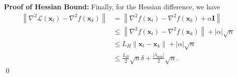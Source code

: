 \documentclass{elsarticle}
\numberwithin{equation}{section}
\begin{document}
\vspace{1em}
\noindent \textbf{Proof of Hessian Bound:}
Finally, for the Hessian difference, we have
\begin{align*}
    \left\| \nabla^2 \mathcal{L}(\mathbf{x}_t) - \nabla^2 f(\mathbf{x}_k) \right\| 
    &= \left\| \nabla^2 f(\mathbf{x}_t) - \nabla^2 f(\mathbf{x}_k) + \alpha \mathbf{I}\right\| \\
    &\leq \left\| \nabla^2 f(\mathbf{x}_t) - \nabla^2 f(\mathbf{x}_k) \right\| +  |\alpha| \sqrt{n} \\
    &\leq L_H \|\mathbf{x}_t - \mathbf{x}_k\| + |\alpha| \sqrt{n} \\
    &\leq \frac{L_H}{2} \sqrt{n} \delta + \frac{|\lambda_{\min}|}{2} \sqrt{n}.
\end{align*}
\qed
\end{document}
